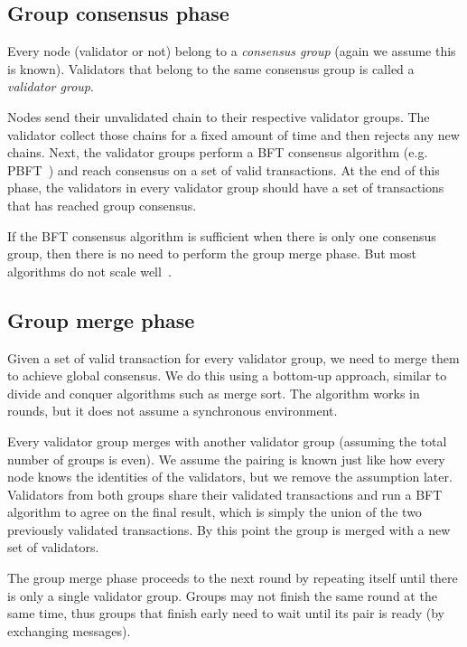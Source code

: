 \subsection{Group consensus phase}
Every node (validator or not) belong to a \emph{consensus group} (again we
assume this is known). Validators that belong to the same consensus group is
called a \emph{validator group}.

Nodes send their unvalidated chain to their respective validator groups. The
validator collect those chains for a fixed amount of time and then rejects any
new chains. Next, the validator groups perform a BFT consensus algorithm (e.g.
PBFT~\cite{castro1999practical}) and reach consensus on a set of valid
transactions. At the end of this phase, the validators in every validator group
should have a set of transactions that has reached group consensus.

If the BFT consensus algorithm is sufficient when there is only one consensus
group, then there is no need to perform the group merge phase. But most
algorithms do not scale well~\cite{vukolic2015quest}.

\subsection{Group merge phase}
Given a set of valid transaction for every validator group, we need to merge
them to achieve global consensus. We do this using a bottom-up approach, similar
to divide and conquer algorithms such as merge sort. The algorithm works in
rounds, but it does not assume a synchronous environment.

Every validator group merges with another validator group (assuming the total
number of groups is even). We assume the pairing is known just like how every
node knows the identities of the validators, but we remove the assumption later.
Validators from both groups share their validated transactions and run a BFT
algorithm to agree on the final result, which is simply the union of the two
previously validated transactions. By this point the group is merged with a new
set of validators.

The group merge phase proceeds to the next round by repeating itself until there
is only a single validator group. Groups may not finish the same round at the
same time, thus groups that finish early need to wait until its pair is ready
(by exchanging messages).

